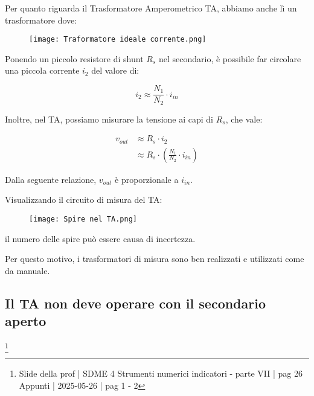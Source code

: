 Per quanto riguarda il Trasformatore Amperometrico TA, abbiamo anche lì un trasformatore dove: 

\begin{figure}[h]
    \centering
    \texttt{[image: Traformatore ideale corrente.png]}
\end{figure}

Ponendo un piccolo resistore di shunt $R_s$ nel secondario, è possibile far circolare una piccola corrente $i_2$ del valore di:

{
    \Large 
    \begin{equation}
        i_2 \approx \frac{N_1}{N_2} \cdot i_{in}
    \end{equation}
}

Inoltre, nel TA, possiamo misurare la tensione ai capi di $R_s$, che vale: 

{
    \Large
    \begin{equation}
        \begin{split}
        v_{out} &\approx R_s \cdot i_2
        \\
        &\approx R_s \cdot \left( \frac{N_1}{N_2} \cdot i_{in} \right)
        \end{split}
    \end{equation}
}

Dalla seguente relazione, $v_{out}$ è proporzionale a $i_{in}$. \newline 

Visualizzando il circuito di misura del TA: 

\begin{figure}[h]
    \centering
    \texttt{[image: Spire nel TA.png]}
\end{figure}

il numero delle spire può essere causa di incertezza. \newline 

Per questo motivo, i trasformatori di misura sono ben realizzati e utilizzati come da manuale. \newline 


\newpage 

\subsection{Il TA non deve operare con il secondario aperto}
\footnote{Slide della prof | SDME 4 Strumenti numerici indicatori - parte VII | pag 26\\  
Appunti | 2025-05-26 | pag 1 - 2} 

